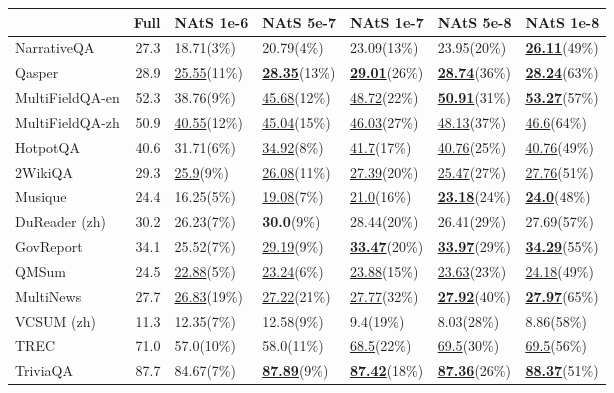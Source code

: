 \begin{tabular}{lrlllll}
\toprule
 & Full & NAtS 1e-6 & NAtS 5e-7 & NAtS 1e-7 & NAtS 5e-8 & NAtS 1e-8 \\
\midrule
NarrativeQA & 27.3 & 18.71(3\%) & 20.79(4\%) & 23.09(13\%) & 23.95(20\%) & \underline{\textbf{26.11}}(49\%) \\
Qasper & 28.9 & \underline{25.55}(11\%) & \underline{\textbf{28.35}}(13\%) & \underline{\textbf{29.01}}(26\%) & \underline{\textbf{28.74}}(36\%) & \underline{\textbf{28.24}}(63\%) \\
MultiFieldQA-en & 52.3 & 38.76(9\%) & \underline{45.68}(12\%) & \underline{48.72}(22\%) & \underline{\textbf{50.91}}(31\%) & \underline{\textbf{53.27}}(57\%) \\
MultiFieldQA-zh & 50.9 & \underline{40.55}(12\%) & \underline{45.04}(15\%) & \underline{46.03}(27\%) & \underline{48.13}(37\%) & \underline{46.6}(64\%) \\
HotpotQA & 40.6 & 31.71(6\%) & \underline{34.92}(8\%) & \underline{41.7}(17\%) & \underline{40.76}(25\%) & \underline{40.76}(49\%) \\
2WikiQA & 29.3 & \underline{25.9}(9\%) & \underline{26.08}(11\%) & \underline{27.39}(20\%) & \underline{25.47}(27\%) & \underline{27.76}(51\%) \\
Musique & 24.4 & 16.25(5\%) & \underline{19.08}(7\%) & \underline{21.0}(16\%) & \underline{\textbf{23.18}}(24\%) & \underline{\textbf{24.0}}(48\%) \\
DuReader (zh) & 30.2 & 26.23(7\%) & \textbf{30.0}(9\%) & 28.44(20\%) & 26.41(29\%) & 27.69(57\%) \\
GovReport & 34.1 & 25.52(7\%) & \underline{29.19}(9\%) & \underline{\textbf{33.47}}(20\%) & \underline{\textbf{33.97}}(29\%) & \underline{\textbf{34.29}}(55\%) \\
QMSum & 24.5 & \underline{22.88}(5\%) & \underline{23.24}(6\%) & \underline{23.88}(15\%) & \underline{23.63}(23\%) & \underline{24.18}(49\%) \\
MultiNews & 27.7 & \underline{26.83}(19\%) & \underline{27.22}(21\%) & \underline{27.77}(32\%) & \underline{\textbf{27.92}}(40\%) & \underline{\textbf{27.97}}(65\%) \\
VCSUM (zh) & 11.3 & 12.35(7\%) & 12.58(9\%) & 9.4(19\%) & 8.03(28\%) & 8.86(58\%) \\
TREC & 71.0 & 57.0(10\%) & 58.0(11\%) & \underline{68.5}(22\%) & \underline{69.5}(30\%) & \underline{69.5}(56\%) \\
TriviaQA & 87.7 & 84.67(7\%) & \underline{\textbf{87.89}}(9\%) & \underline{\textbf{87.42}}(18\%) & \underline{\textbf{87.36}}(26\%) & \underline{\textbf{88.37}}(51\%) \\

\end{tabular}

